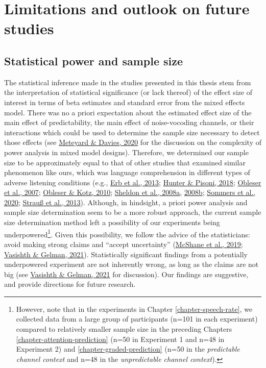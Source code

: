 \documentclass[a4paper, nobind]{templates/ociamthesis}
\begin{document}
\hypertarget{limitations-and-outlook-on-future-studies}{%
\section{Limitations and outlook on future studies}\label{limitations-and-outlook-on-future-studies}}

\hypertarget{statistical-power-and-sample-size}{%
\subsection{Statistical power and sample size}\label{statistical-power-and-sample-size}}

The statistical inference made in the studies presented in this thesis stem from the interpretation of statistical significance (or lack thereof) of the effect size of interest in terms of beta estimates and standard error from the mixed effects model.
There was no a priori expectation about the estimated effect size of the main effect of predictability, the main effect of noise-vocoding channels, or their interactions which could be used to determine the sample size necessary to detect those effects
(see \protect\hyperlink{ref-Meteyard2020}{Meteyard \& Davies, 2020} for the discussion on the complexity of power analysis in mixed model designs).
Therefore, we determined our sample size to be approximately equal to that of other studies that examined similar phenomenon like ours, which was language comprehension in different types of adverse listening conditions (e.g., \protect\hyperlink{ref-Erb2013}{Erb et al., 2013}; \protect\hyperlink{ref-Hunter2018}{Hunter \& Pisoni, 2018}; \protect\hyperlink{ref-Obleser2007}{Obleser et al., 2007}; \protect\hyperlink{ref-Obleser2010}{Obleser \& Kotz, 2010}; \protect\hyperlink{ref-Sheldon2008a}{Sheldon et al., 2008a}, \protect\hyperlink{ref-Sheldon2008b}{2008b}; \protect\hyperlink{ref-Sommers2020}{Sommers et al., 2020}; \protect\hyperlink{ref-Strauss2013}{Strauß et al., 2013}).
Although, in hindsight, a priori power analysis and sample size determination seem to be a more robust approach,
the current sample size determination method left a possibility of our experiments being underpowered\footnote{However, note that in the experiments in Chapter \ref{chapter-speech-rate}, we collected data from a large group of participants (n=101 in each experiment) compared to relatively smaller sample size in the preceding Chapters \ref{chapter-attention-prediction} (n=50 in Experiment 1 and n=48 in Experiment 2) and \ref{chapter-graded-prediction} (n=50 in the \emph{predictable channel context} and n=48 in the \emph{unpredictable channel context}).}.
Given this possibility, we follow the advice of the statisticians:
avoid making strong claims and ``accept uncertainty'' (\protect\hyperlink{ref-McShane2019}{McShane et al., 2019}; \protect\hyperlink{ref-Vasishth2021}{Vasishth \& Gelman, 2021}).
Statistically significant findings from a potentially underpowered experiment are not inherently wrong, as long as the claims are not big (see \protect\hyperlink{ref-Vasishth2021}{Vasishth \& Gelman, 2021} for discussion).
Our findings are suggestive, and provide directions for future research.
\end{document}
